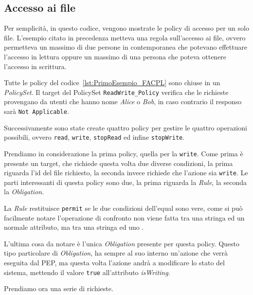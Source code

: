 \subsection{Accesso ai file} %
\label{ssub:primo_esempio}

Per semplicità, in questo codice, vengono mostrate le policy di accesso per un solo file.
L'esempio citato in precedenza metteva una regola sull'accesso ai file, ovvero permetteva un massimo di due persone in contemporanea che potevano effettuare l'accesso in lettura oppure un massimo di una persona che poteva ottenere l'accesso in scrittura.\\ \par
Tutte le policy del codice~\ref{lst:PrimoEsempio_FACPL} sono chiuse in un \textit{PolicySet}. Il target del PolicySet \texttt{ReadWrite\_Policy} verifica che le richieste provengano da utenti che hanno nome \textit{Alice} o \textit{Bob}, in caso contrario il responso sarà \texttt{Not Applicable}.\\ \par
Successivamente sono state create quattro policy per gestire le quattro operazioni possibili, ovvero \texttt{read}, \texttt{write}, \texttt{stopRead} ed infine \texttt{stopWrite}.\\ \par
Prendiamo in considerazione la prima policy, quella per la \texttt{write}. Come prima è presente un target, che richiede questa volta due diverse condizioni, la prima riguarda l'id del file richiesto, la seconda invece richiede che l'azione sia \texttt{write}. Le parti interessanti di questa policy sono due, la prima riguarda la \textit{Rule}, la seconda la \textit{Obligation}.\\ \par
La \textit{Rule} restituisce \texttt{permit} se le due condizioni dell'equal sono vere, come si può facilmente notare l'operazione di confronto non viene fatta tra una stringa ed un normale attributo, ma tra una stringa ed uno \statusattribute.\\ \par
L'ultima cosa da notare è l'unica \textit{Obligation} presente per questa policy. Questo tipo particolare di \textit{Obligation}, ha sempre al suo interno un'azione che verrà eseguita dal PEP, ma questa volta l'azione andrà a modificare lo stato del sistema, mettendo il valore \texttt{true} all'attributo \textit{isWriting}.\\ \par
Prendiamo ora una serie di richieste.


